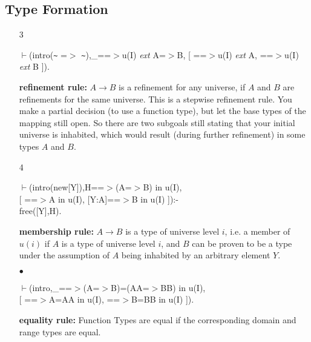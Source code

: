 \documentclass[11pt]{report}
\begin{document}
 \subsection{Type Formation}
 \begin{enumerate}
 \item[3]
\begin{sf}\begin{tabbing}
$\vdash$(intro({\verb`~`} =$>$ {\verb`~`}),\_\hspace{0.1em}==$>$u(I) \mbox{\it ext} A=$>$B, [ ==$>$u(I) \mbox{\it ext} A, ==$>$u(I) \mbox{\it ext} B ]).
\end{tabbing}\end{sf}

 {\bf refinement rule:} 
 $A\rightarrow B$ is a refinement
 for any universe, if $A$ and $B$ are refinements for the
 same universe. This is a stepwise
 refinement rule. You make a partial decision (to use a function type),
 but let the base types of the mapping still open. So there are two 
 subgoals still stating that your initial universe is inhabited,
 which would result (during further refinement) in some types $A$ and
 $B$.
  
 \item[4]
\begin{sf}\begin{tabbing}
$\vdash$(intro(new[Y]),H==$>$(A=$>$B) in u(I),\\[-0.15ex]
\hspace{2em}[ ==$>$A in u(I), [Y:A]==$>$B in u(I) ]):-\\[-0.15ex]
\hspace{2em}free([Y],H).
\end{tabbing}\end{sf}

 {\bf membership rule:} 
 $A\rightarrow B$ is a type of universe level $i$,
 i.e. a member of $u(i)$ if $A$ is a type of universe level $i$,
 and $B$ can be proven to be a type under the assumption of $A$
 being inhabited by an arbitrary element $Y$.
  
 \item[$\bullet$]
\begin{sf}\begin{tabbing}
$\vdash$(intro,\_\hspace{0.1em}==$>$(A=$>$B)=(AA=$>$BB) in u(I),\\[-0.15ex]
\hspace{2em}[ ==$>$A=AA in u(I), ==$>$B=BB in u(I) ]).
\end{tabbing}\end{sf}

 {\bf equality rule:}
 Function Types are equal if the corresponding domain and range types 
 are equal.
 \end{enumerate}
  
\end{document}
